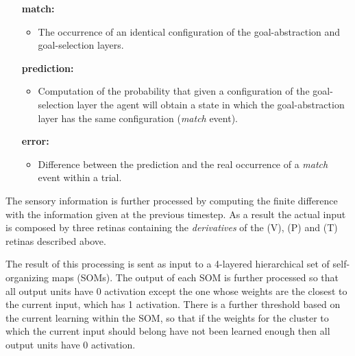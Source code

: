 \documentclass[11pt]{article}
\begin{document}
\begin{itemize}[leftmargin=3cm]  

    \item[\textbf{match:}]

        \begin{itemize}

            \item The occurrence of an identical configuration of the
                goal-abstraction and goal-selection layers. 

        \end{itemize}    

    \item[\textbf{prediction:}]

        \begin{itemize}

            \item Computation of the probability that given a configuration of
                the goal-selection layer the agent will obtain a state in which
                the goal-abstraction layer has the same configuration
                (\emph{match} event). 

        \end{itemize}  

    \item[\textbf{error:}]

        \begin{itemize}

            \item Difference between the prediction and the real occurrence of
                a \emph{match} event within a trial.

        \end{itemize}  

\end{itemize} 

\label{sec:abstraction}

The sensory information is further processed by computing the finite difference
with the information given at the previous timestep. As a result the actual
input is composed by three retinas containing the \emph{derivatives} of the
(V), (P) and (T) retinas described above. 

The result of this processing is sent as input to a 4-layered hierarchical set
of self-organizing maps (SOMs). The output of each SOM is further processed so
that all output units have 0 activation except the one whose weights are the
closest to the current input, which has 1 activation.  There is a further
threshold based on the current learning within the SOM, so that if the weights
for the cluster to which the current input should belong have not been learned
enough then all output units have 0 activation.
\end{document}
